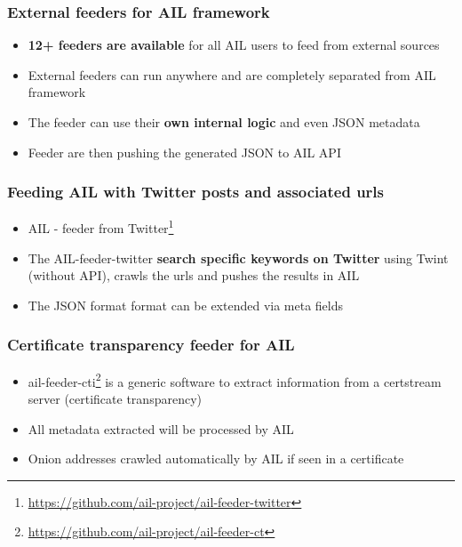 
\begin{frame}[fragile]
    \frametitle{External feeders for AIL framework}
    \begin{itemize}
        \item {\bf 12+ feeders are available} for all AIL users to feed from external sources
        \item External feeders can run anywhere and are completely separated from AIL framework
        \item The feeder can use their {\bf own internal logic} and even JSON metadata
        \item Feeder are then pushing the generated JSON to AIL API
    \end{itemize}
\end{frame}

\begin{frame}[fragile]
   \frametitle{Feeding AIL with Twitter posts and associated urls}
        \begin{itemize}
                \item AIL - feeder from Twitter\footnote{\url{https://github.com/ail-project/ail-feeder-twitter}}
                \item The AIL-feeder-twitter {\bf search specific keywords on Twitter} using Twint (without API), crawls the urls and pushes the results in AIL
                \item The JSON format format can be extended via meta fields
        \end{itemize}
\end{frame}

\begin{frame}[fragile]
   \frametitle{Certificate transparency feeder for AIL}
    \begin{itemize}
        \item ail-feeder-cti\footnote{\url{https://github.com/ail-project/ail-feeder-ct}} is a generic software to extract information from a certstream server (certificate transparency)
        \item All metadata extracted will be processed by AIL
        \item Onion addresses crawled automatically by AIL if seen in a certificate 
    \end{itemize}
\end{frame}

